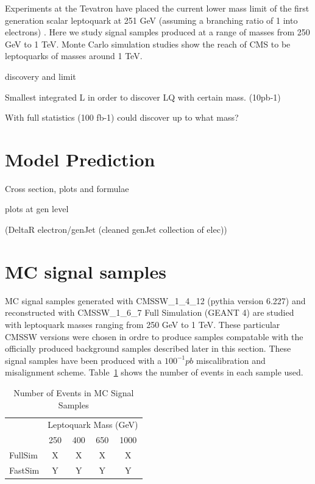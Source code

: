 \documentclass{cmspaper}
\begin{document}
Experiments at the Tevatron have placed the current lower mass limit of the first generation scalar leptoquark at 251 GeV (assuming a branching ratio of 1 into electrons) \cite{d02007}.  Here we study signal samples produced at a range of masses from 250 GeV to 1 TeV.  Monte Carlo simulation studies show the reach of CMS to be leptoquarks of masses around 1 TeV.

discovery and limit 

Smallest integrated L in order to discover LQ with certain mass. (10pb-1)

With full statistics (100 fb-1) could discover up to what mass?

\section{Model Prediction}
Cross section, plots and formulae

plots at gen level

(DeltaR electron/genJet (cleaned genJet collection of elec))


\section{MC signal samples}

MC signal samples generated with CMSSW\_1\_4\_12 (pythia version 6.227) and reconstructed with CMSSW\_1\_6\_7 Full Simulation (GEANT 4) are studied with leptoquark masses ranging from 250 GeV to 1 TeV.  These particular CMSSW versions were chosen in ordre to produce samples compatable with the officially produced background samples described later in this section.  These signal samples have been produced with a $100^{-1}pb$ miscalibration and misalignment scheme.  Table~\ref{tab:NumEvents} shows the number of events in each sample used. 

  \begin{table}[htb]
    \caption{Number of Events in MC Signal Samples}
    \label{tab:NumEvents}
    \begin{center}
      \begin{tabular}{|l|cccc|} \hline
               & \multicolumn{4}{c|}{Leptoquark Mass (GeV)} \\ 
         & 250 & 400 & 650 & 1000 \\ \hline
        FullSim & X  &  X  & X  &  X  \\
        FastSim  & Y & Y & Y &  Y  \\ \hline
      \end{tabular}
    \end{center}
  \end{table}
\end{document}
